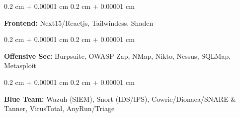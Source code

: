 \documentclass[10pt, letterpaper]{article}
\newenvironment{onecolentry}{
    \begin{adjustwidth}{
        0.2 cm + 0.00001 cm
    }{
        0.2 cm + 0.00001 cm
    }
}{
    \end{adjustwidth}
} %
\begin{document}
        \vspace{0.2 cm}

        \begin{onecolentry}
            \textbf{Frontend:} Next15/Reactjs, Tailwindcss, Shadcn
        \end{onecolentry}
    
        \vspace{0.2 cm}

        \begin{onecolentry}
            \textbf{Offensive Sec:} Burpsuite, OWASP Zap, NMap, Nikto, Nessus, SQLMap, Metasploit
        \end{onecolentry}

        \vspace{0.2 cm}

        \begin{onecolentry}
            \textbf{Blue Team:} Wazuh (SIEM), Snort (IDS/IPS), Cowrie/Dionaea/SNARE \& Tanner, VirusTotal, AnyRun/Triage
        \end{onecolentry}
\end{document}
